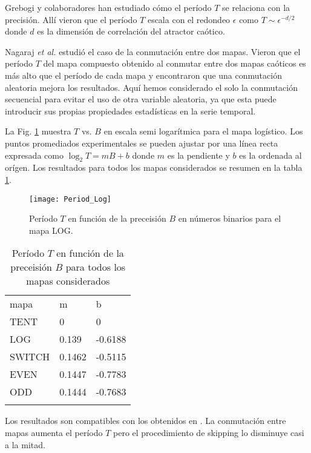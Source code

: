 Grebogi y colaboradores \cite{Grebogi1988} han estudiado cómo el período $T$ se relaciona con la precisión.
Allí vieron que el período $T$ escala con el redondeo $\epsilon$ como $T \sim \epsilon^{-d/2}$ donde $d$ es la dimensión de correlación del atractor caótico.

Nagaraj \textit{et al.} \cite{Nagaraj2008} estudió el caso de la conmutación entre dos mapas.
Vieron que el período $T$ del mapa compuesto obtenido al conmutar entre dos mapas caóticos es más alto que el período de cada mapa y encontraron que una conmutación aleatoria mejora los resultados.
Aquí hemos considerado el solo la conmutación secuencial para evitar el uso de otra variable aleatoria, ya que esta puede introducir sus propias propiedades estadísticas en la serie temporal.

La Fig. \ref{fig:period} muestra $T$ vs. $B$ en escala semi logarítmica para el mapa logístico.
Los puntos promediados experimentales se pueden ajustar por una línea recta expresada como $\log_2 T = mB + b$ donde $m$ es la pendiente y $b$ es la ordenada al orígen.
Los resultados para todos los mapas considerados se resumen en la tabla \ref{tabla:periodos}.
%
\begin{figure}[htpb]
\centering	
	\texttt{[image: Period\_Log]}
	\caption{Período $T$ en función de la preceisión $B$ en números binarios para el mapa LOG.} \label{fig:period}
\end{figure}
%
\begin{table}[htpb]
\centering	
	\caption{Período $T$ en función de la preceisión $B$ para todos los mapas considerados}
	\vspace{1em}
	\begin{tabular}{lll}
		\hline\noalign{\smallskip}
		mapa & m & b  \\
		\noalign{\smallskip}\hline\noalign{\smallskip}
		TENT&0 & 0 \\
		LOG &0.139 & -0.6188 \\
		SWITCH &0.1462 & -0.5115 \\
		EVEN &0.1447 & -0.7783 \\
		ODD &0.1444 & -0.7683 \\
		\noalign{\smallskip}\hline
	\end{tabular}
	\label{tabla:periodos}	
\end{table}

Los resultados son compatibles con los obtenidos en \cite{Nagaraj2008}.
La conmutación entre mapas aumenta el período $T$ pero el procedimiento de skipping lo disminuye casi a la mitad.